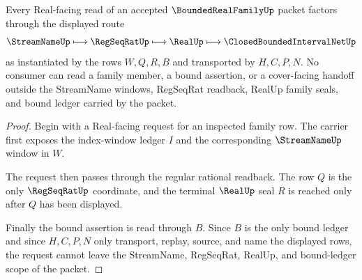 \begin{theorem}
\label{thm:bounded-real-family-regseqrat-scope}
Every Real-facing read of an accepted $\BoundedRealFamilyUp$ packet factors through the displayed route
$$
\StreamNameUp\longmapsto \RegSeqRatUp\longmapsto \RealUp\longmapsto \ClosedBoundedIntervalNetUp
$$
as instantiated by the rows $W,Q,R,B$ and transported by $H,C,P,N$. No consumer can read a family member, a bound assertion, or a cover-facing handoff outside the StreamName windows, RegSeqRat readback, RealUp family seals, and bound ledger carried by the packet.
\end{theorem}
\begin{proof}
Begin with a Real-facing request for an inspected family row. The carrier first exposes the index-window ledger $I$ and the corresponding $\StreamNameUp$ window in $W$.

The request then passes through the regular rational readback. The row $Q$ is the only $\RegSeqRatUp$ coordinate, and the terminal $\RealUp$ seal $R$ is reached only after $Q$ has been displayed.

Finally the bound assertion is read through $B$. Since $B$ is the only bound ledger and since $H,C,P,N$ only transport, replay, source, and name the displayed rows, the request cannot leave the StreamName, RegSeqRat, RealUp, and bound-ledger scope of the packet.
\end{proof}


